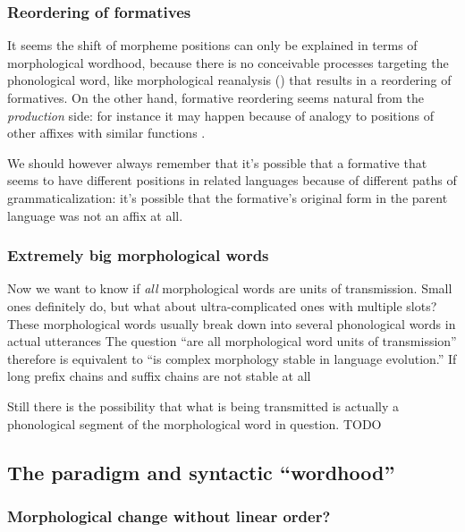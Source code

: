 \documentclass[a4paper, oneside, scheme=plain, 12pt]{article}
\newcommand*{\citepage}[1]{p.~{#1}}
\begin{document}
\subsubsection{Reordering of formatives}\label{sec:reordering-of-formative}

It seems the shift of morpheme positions can only be explained in terms of morphological wordhood,
because there is no conceivable processes targeting the phonological word,
like morphological reanalysis () that results in a reordering of formatives.
On the other hand, formative reordering seems natural from the \emph{production} side:
for instance it may happen because of analogy to positions of other affixes with similar functions
\citep[\citepage{252}]{campbell2013historical}.

We should however always remember that it's possible that
a formative that seems to have different positions in related languages
because of different paths of grammaticalization:
it's possible that the formative's original form in the parent language was not an affix at all.

\subsubsection{Extremely big morphological words}\label{sec:extremely-big-morphological-words}

Now we want to know if \emph{all} morphological words are units of transmission.
Small ones definitely do, but what about ultra-complicated ones with multiple slots?
These morphological words usually break down into several phonological words in actual utterances 
The question ``are all morphological word units of transmission'' therefore is equivalent to 
``is complex morphology stable in language evolution.''
If long prefix chains and suffix chains are not stable at all

Still there is the possibility that what is being transmitted is actually
a phonological segment of the morphological word in question.
TODO

\subsection{The paradigm and syntactic ``wordhood''}

\subsubsection{Morphological change without linear order?}\label{sec:morphological-change-based-on-syntactic-word}
\end{document}

